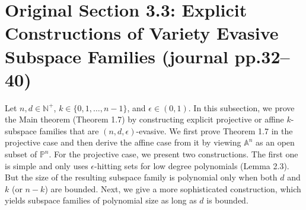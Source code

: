 \documentclass[10pt,a4paper]{article}
\newcommand{\PP}{\mathbb P}
\newcommand{\Aspace}{\mathbb A}
\begin{document}
\section*{Original Section 3.3: Explicit Constructions of Variety Evasive Subspace Families (journal pp.32--40)}
Let $n,d\in\mathbb N^+$, $k\in\{0,1,\ldots,n-1\}$, and $\epsilon\in(0,1)$. In this subsection, we prove the Main theorem (Theorem 1.7) by constructing explicit projective or affine $k$-subspace families that are $(n,d,\epsilon)$-evasive.
We first prove Theorem 1.7 in the projective case and then derive the affine case from it by viewing $\Aspace^n$ as an open subset of $\PP^n$. For the projective case, we present two constructions. The first one is simple and only uses $\epsilon$-hitting sets for low degree polynomials (Lemma 2.3). But the size of the resulting subspace family is polynomial only when both $d$ and $k$ (or $n-k$) are bounded. Next, we give a more sophisticated construction, which yields subspace families of polynomial size as long as $d$ is bounded.
\end{document}
